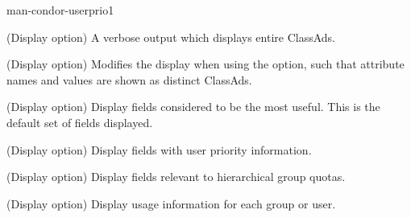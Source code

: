 \begin{ManPage}{}{man-condor-userprio}{1}
\begin{Options}
  {(Display option) A verbose output which displays entire ClassAds.  }

  {(Display option) Modifies the display when using the  option,
  such that attribute names and values are shown as distinct ClassAds. }

  {(Display option) Display fields considered to be the most useful.
  This is the default set of fields displayed.   }

  {(Display option) Display fields with user priority information.  }

  {(Display option) Display fields relevant to hierarchical group quotas.  }

  {(Display option) Display usage information for each group or user.}

\end{Options}

\Examples


\end{ManPage}
